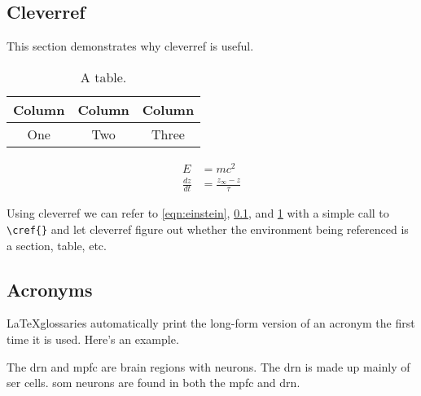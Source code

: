 \subsection{Cleverref} \label{sec:intro_part}

This section demonstrates why cleverref is useful.

\begin{table}
    \caption{A table.}
    \begin{tabular}{ccc}
        Column & Column & Column \\ \hline
        One & Two & Three
    \end{tabular}
    \label{tab:exampletable}
\end{table}

\begin{align}
    E &= mc^2 \label{eqn:einstein} \\
    \frac{dz}{dt} &= \frac{z_\infty - z}{\tau} \label{eqn:nonsense}
\end{align}

Using cleverref we can refer to \cref{eqn:einstein}, \cref{sec:intro_part}, and
\cref{tab:exampletable} with a simple call to \verb|\cref{}| and let cleverref
figure out whether the environment being referenced is a section, table, etc.

\subsection{Acronyms}

\LaTeX glossaries automatically print the long-form version of an acronym the
first time it is used. Here's an example.

The \gls{drn} and \gls{mpfc} are brain regions with neurons. The \gls{drn}
is made up mainly of \gls{ser} cells. \Gls{som} neurons are found in both the
\gls{mpfc} and \gls{drn}.
